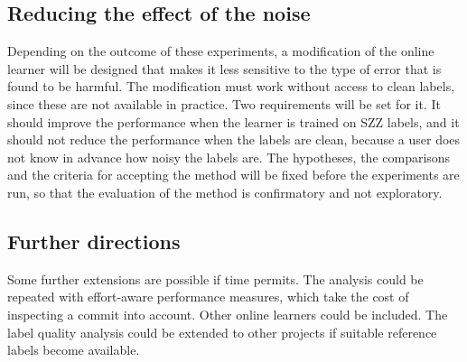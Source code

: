 \documentclass[12pt,a4paper,oneside]{report}
\begin{document}
\subsection{Reducing the effect of the noise}

Depending on the outcome of these experiments, a modification of the online
learner will be designed that makes it less sensitive to the type of error
that is found to be harmful. The modification must work without access to
clean labels, since these are not available in practice. Two requirements
will be set for it. It should improve the performance when the learner is
trained on SZZ labels, and it should not reduce the performance when the
labels are clean, because a user does not know in advance how noisy the
labels are. The hypotheses, the comparisons and the criteria for accepting
the method will be fixed before the experiments are run, so that the
evaluation of the method is confirmatory and not exploratory.

\subsection{Further directions}

Some further extensions are possible if time permits. The analysis could be
repeated with effort-aware performance measures, which take the cost of
inspecting a commit into account. Other online learners could be included.
The label quality analysis could be extended to other projects if suitable
reference labels become available.
\end{document}
